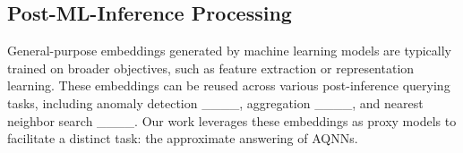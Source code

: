 
\subsection{Post-ML-Inference Processing}
General-purpose embeddings generated by machine learning models are typically trained on broader objectives, such as feature extraction or representation learning. These embeddings can be reused across various post-inference querying tasks, including anomaly detection ____, aggregation ____, and nearest neighbor search ____. Our work leverages these embeddings as proxy models to facilitate a distinct task: the approximate answering of AQNNs.